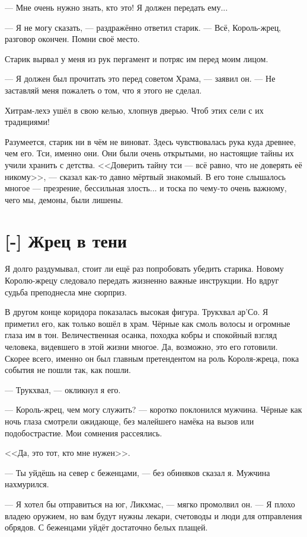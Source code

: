 --- Мне очень нужно знать, кто это!
Я должен передать ему...

--- Я не могу сказать, --- раздражённо ответил старик.
--- Всё, Король-жрец, разговор окончен.
Помни своё место.

Старик вырвал у меня из рук пергамент и потряс им перед моим лицом.

--- Я должен был прочитать это перед советом Храма, --- заявил он.
--- Не заставляй меня пожалеть о том, что я этого не сделал.

Хитрам-лехэ ушёл в свою келью, хлопнув дверью.
Чтоб этих сели с их традициями!

Разумеется, старик ни в чём не виноват.
Здесь чувствовалась рука куда древнее, чем его.
Тси, именно они.
Они были очень открытыми, но настоящие тайны их учили хранить с детства.
<<Доверить тайну тси --- всё равно, что не доверять её никому>>, --- сказал как-то давно мёртвый знакомый.
В его тоне слышалось многое --- презрение, бессильная злость... и тоска по чему-то очень важному, чего мы, демоны, были лишены.

\section{[-] Жрец в тени}

Я долго раздумывал, стоит ли ещё раз попробовать убедить старика.
Новому Королю-жрецу следовало передать жизненно важные инструкции.
Но вдруг судьба преподнесла мне сюрприз.

В другом конце коридора показалась высокая фигура.
Трукхвал ар'Со.
Я приметил его, как только вошёл в храм.
Чёрные как смоль волосы и огромные глаза им в тон.
Величественная осанка, походка кобры и спокойный взгляд человека, видевшего в этой жизни многое.
Да, возможно, это его готовили.
Скорее всего, именно он был главным претендентом на роль Короля-жреца, пока события не пошли так, как пошли.

--- Трукхвал, --- окликнул я его.

--- Король-жрец, чем могу служить? --- коротко поклонился мужчина.
Чёрные как ночь глаза смотрели ожидающе, без малейшего намёка на вызов или подобострастие.
Мои сомнения рассеялись.

<<Да, это тот, кто мне нужен>>.

--- Ты уйдёшь на север с беженцами, --- без обиняков сказал я.
Мужчина нахмурился.

--- Я хотел бы отправиться на юг, Ликхмас, --- мягко промолвил он.
--- Я плохо владею оружием, но вам будут нужны лекари, счетоводы и люди для отправления обрядов.
С беженцами уйдёт достаточно белых плащей.

